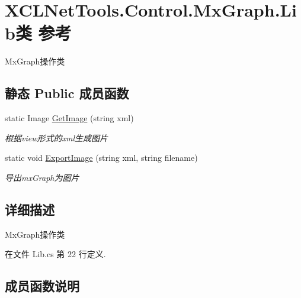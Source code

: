 \hypertarget{class_x_c_l_net_tools_1_1_control_1_1_mx_graph_1_1_lib}{}\section{X\+C\+L\+Net\+Tools.\+Control.\+Mx\+Graph.\+Lib类 参考}
\label{class_x_c_l_net_tools_1_1_control_1_1_mx_graph_1_1_lib}


Mx\+Graph操作类  


\subsection*{静态 Public 成员函数}
\begin{DoxyCompactItemize}
\item 
static Image \hyperlink{class_x_c_l_net_tools_1_1_control_1_1_mx_graph_1_1_lib_abff455d51f61485d6bf26e0133af6000}{Get\+Image} (string xml)
\begin{DoxyCompactList}\small\item\em 根据view形式的xml生成图片 \end{DoxyCompactList}\item 
static void \hyperlink{class_x_c_l_net_tools_1_1_control_1_1_mx_graph_1_1_lib_ad6b09c60b11a1f51a6bf45cc3bde1b88}{Export\+Image} (string xml, string filename)
\begin{DoxyCompactList}\small\item\em 导出mx\+Graph为图片 \end{DoxyCompactList}\end{DoxyCompactItemize}


\subsection{详细描述}
Mx\+Graph操作类 



在文件 Lib.\+cs 第 22 行定义.



\subsection{成员函数说明}
